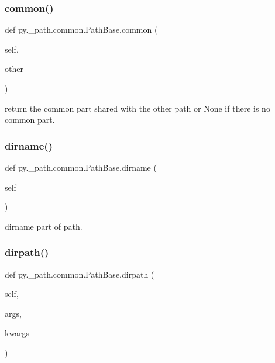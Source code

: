 \subsubsection{\texorpdfstring{common()}{common()}}
{\footnotesize\ttfamily def py.\+\_\+path.\+common.\+Path\+Base.\+common (\begin{DoxyParamCaption}\item[{}]{self,  }\item[{}]{other }\end{DoxyParamCaption})}

\begin{DoxyVerb}return the common part shared with the other path
    or None if there is no common part.
\end{DoxyVerb}
 \mbox{\label{classpy_1_1__path_1_1common_1_1_path_base_a715389005352031624fa57678074ad8a}} 
\subsubsection{\texorpdfstring{dirname()}{dirname()}}
{\footnotesize\ttfamily def py.\+\_\+path.\+common.\+Path\+Base.\+dirname (\begin{DoxyParamCaption}\item[{}]{self }\end{DoxyParamCaption})}

\begin{DoxyVerb}dirname part of path. \end{DoxyVerb}
 \mbox{\label{classpy_1_1__path_1_1common_1_1_path_base_a0128f83902ae05ea9262d284b5c80946}} 
\subsubsection{\texorpdfstring{dirpath()}{dirpath()}}
{\footnotesize\ttfamily def py.\+\_\+path.\+common.\+Path\+Base.\+dirpath (\begin{DoxyParamCaption}\item[{}]{self,  }\item[{}]{args,  }\item[{}]{kwargs }\end{DoxyParamCaption})}

